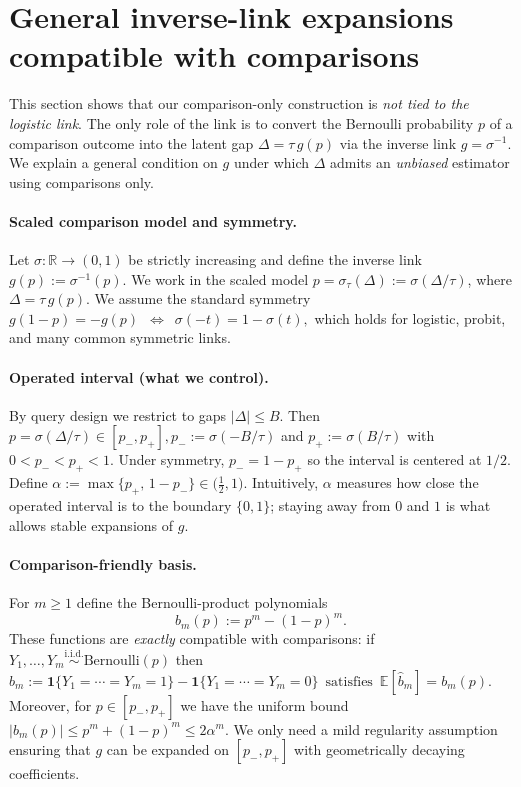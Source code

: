 \documentclass[11pt]{article}
\theoremstyle{plain}
\theoremstyle{remark}
\newcommand{\R}{\mathbb{R}}
\newcommand{\E}{\mathbb{E}}
\newcommand{\1}{\mathbf{1}}
\begin{document}
\section{General inverse-link expansions compatible with comparisons}
\label{sec:general_link_series}

This section shows that our comparison-only construction is \emph{not tied to the logistic link}.
The only role of the link is to convert the Bernoulli probability $p$ of a comparison outcome into the
latent gap $\Delta=\tau\,g(p)$ via the inverse link $g=\sigma^{-1}$. We explain a general condition on
$g$ under which $\Delta$ admits an \emph{unbiased} estimator using comparisons only.

\paragraph{Scaled comparison model and symmetry.}
Let $\sigma:\R\to(0,1)$ be strictly increasing and define the inverse link
$
g(p):=\sigma^{-1}(p).
$
We work in the scaled model
$
p=\sigma_\tau(\Delta):=\sigma(\Delta/\tau)$, where 
$
\Delta=\tau\,g(p).$ 
We assume the standard symmetry
$
g(1-p)=-g(p)
\,\,\, \Longleftrightarrow \,\,\,
\sigma(-t)=1-\sigma(t),
$
which holds for logistic, probit, and many common symmetric links.

\paragraph{Operated interval (what we control).}
By query design we restrict to gaps $|\Delta|\le B$. Then
$
p=\sigma(\Delta/\tau)\in[p_-,p_+], 
p_-:=\sigma(-B/\tau)$ and  $p_+:=\sigma(B/\tau)$ 
with $0<p_-<p_+<1$. Under symmetry, $p_-=1-p_+$ so the interval is centered at $1/2$.
Define
$
\alpha:=\max\{p_+,\,1-p_-\}\in\Big(\frac12,1\Big).$
Intuitively, $\alpha$ measures how close the operated interval is to the boundary $\{0,1\}$; staying
away from $0$ and $1$ is what allows stable expansions of $g$.

\paragraph{Comparison-friendly basis.}
For $m\ge1$ define the Bernoulli-product polynomials
\[
b_m(p):=p^m-(1-p)^m .
\]
These functions are \emph{exactly} compatible with comparisons: if
$Y_1,\dots,Y_m\stackrel{\mathrm{i.i.d.}}{\sim}\mathrm{Bernoulli}(p)$ then
$
\widehat b_m
:=\1\{Y_1=\cdots=Y_m=1\}-\1\{Y_1=\cdots=Y_m=0\}
\,\,\, \text{satisfies}\,\,\,
\E[\widehat b_m]=b_m(p).
$
Moreover, for $p\in[p_-,p_+]$ we have the uniform bound
$
|b_m(p)|\le p^m+(1-p)^m \le 2\alpha^m.
$ We only need a mild regularity assumption ensuring that $g$ can be expanded on $[p_-,p_+]$ with
geometrically decaying coefficients.
\end{document}

